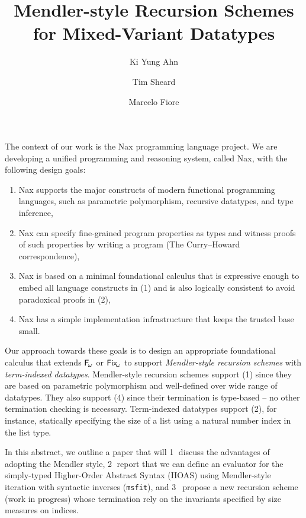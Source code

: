 \documentclass[a4paper]{easychair} %
\title{Mendler-style Recursion Schemes for Mixed-Variant Datatypes}
\author{
Ki Yung Ahn\inst{1}
\and
Tim Sheard\inst{1}
 \and
Marcelo Fiore\inst{2}
}
\institute{
  Portland State University~\thanks{supported by NSF grant 0910500.}
\and
  University of Cambridge
}
\newcommand{\Fw}[0]{{\ensuremath{\mathsf{\uppercase{F}}_{\!\omega}}}}
\newcommand{\Fixw}[0]{{\ensuremath{\mathsf{\uppercase{F}\lowercase{ix}}_{\!\omega}}}}
\newcommand{\msfit}[0]{\texttt{msfit}}
\begin{document}
\maketitle


The context of our work is the Nax programming language project.
We are developing a unified programming and reasoning system,
called Nax, with the following design goals:\vspace*{-1ex}
\begin{enumerate}[(1)]
 \item Nax supports the major constructs of modern functional programming languages,
 such as parametric polymorphism, recursive datatypes, and type inference,
 \vspace*{-1.2ex}
 \item Nax can specify fine-grained program properties as types and
 witness proofs of such properties by writing a program (The Curry--Howard correspondence),
 \vspace*{-1.2ex}
 \item Nax is based on a minimal foundational calculus
 that is expressive enough to embed all language constructs in (1)
 and is also logically consistent to avoid paradoxical proofs in (2),\vspace*{-1.2ex}
 \item Nax has a simple implementation infrastructure that keeps the trusted base small.
\end{enumerate}
\vspace*{-.5ex}
Our approach towards these goals is to 
design an appropriate foundational calculus
that extends \Fw \cite{Girard72} or \Fixw \cite{AbeMat04} to support
\emph{Mendler-style recursion schemes} \cite{Mendler87} with \emph{term-indexed datatypes}.
Mendler-style recursion schemes support (1) since they are based
on parametric polymorphism and well-defined over wide range of datatypes.
They also support (4) since their termination is type-based --
no other termination checking is necessary.
Term-indexed datatypes support (2), for instance,
statically specifying the size of a list using a natural number index in the list type.

In this abstract, we outline a paper
that will
\textcircled{1} discuss the advantages of adopting the Mendler style,
\textcircled{2} report that we can define an evaluator for the simply-typed
Higher-Order Abstract Syntax (HOAS) using Mendler-style iteration
with syntactic inverses (\msfit), and
\textcircled{3}~propose a new recursion scheme (work in progress) whose
termination rely on the invariants specified by size measures on indices.
\vspace*{-1ex}
\end{document}
